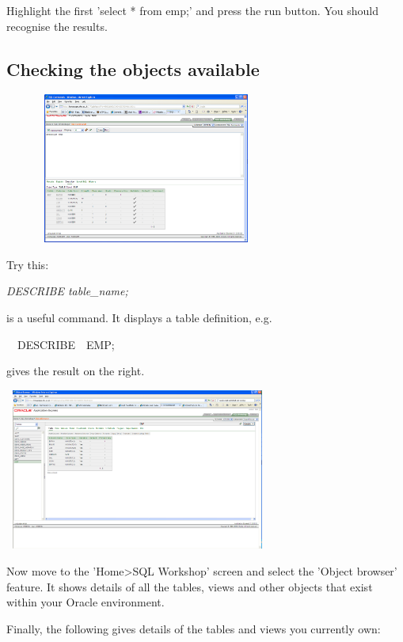 Highlight the first 'select * from emp;' and press the run button.  You should recognise the results.

\subsection{Checking the objects available}


\begin{center}
  
\includegraphics[width=9.35cm,height=4.944cm]{images/img (12).png}

\end{center}
Try this:

\emph{DESCRIBE table\_name;}

is a useful command. It displays a table definition, e.g.

\ \ DESCRIBE\ \ EMP;

gives the result on the right.



\begin{center}
  
\includegraphics[width=8.751cm,height=5.309cm]{images/img (13).png}

\end{center}
Now move to the 'Home{\textgreater}SQL Workshop' screen and select the 'Object browser' feature. It shows details of all the tables, views and other objects that exist within your Oracle environment. 

Finally, the following gives details of the tables and views you currently own:

